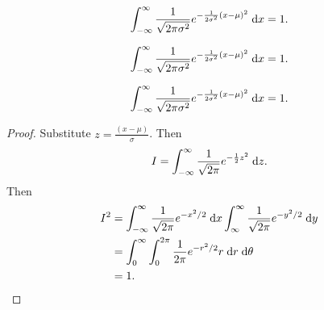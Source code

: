 \begin{note}
  \begin{field}
    \begin{prop}
      \[
        \int_{-\infty}^\infty \frac{1}{\sqrt{2\pi \sigma^2}} e^{-\frac{1}{2\sigma^2}(x - \mu)^2}\;\mathrm{d} x = 1.
      \]
    \end{prop}
  \end{field}
  \begin{field}
    \begin{prop}
      \[
        \int_{-\infty}^\infty \frac{1}{\sqrt{2\pi \sigma^2}} e^{-\frac{1}{2\sigma^2}(x - \mu)^2}\;\mathrm{d} x = 1.
      \]
    \end{prop}
  \end{field}
  \xplain{}%
\end{note}

%
\begin{note}
  \begin{field}
    \begin{prop}
      \[
        \int_{-\infty}^\infty \frac{1}{\sqrt{2\pi \sigma^2}} e^{-\frac{1}{2\sigma^2}(x - \mu)^2}\;\mathrm{d} x = 1.
      \]
    \end{prop}
  \end{field}
  \begin{field}
    \begin{proof}
      Substitute $z = \frac{(x - \mu)}{\sigma}$. Then
      \[
        I = \int_{-\infty}^\infty \frac{1}{\sqrt{2\pi}}e^{-\frac{1}{2}z^2}\;\mathrm{d} z.
      \]
      Then
      \begin{align*}
        I^2 &= \int_{-\infty}^\infty \frac{1}{\sqrt{2\pi}} e^{-x^2/2}\;\mathrm{d} x\int_{\infty}^\infty \frac{1}{\sqrt{2\pi}} e^{-y^2/2}\;\mathrm{d} y\\
        &= \int_0^\infty \int_0^{2\pi}\frac{1}{2\pi}e^{-r^2/2}r\;\mathrm{d} r\;\mathrm{d} \theta\\
        &= 1.\qedhere
      \end{align*}
    \end{proof}
  \end{field}
  \xplain{}%
\end{note}


